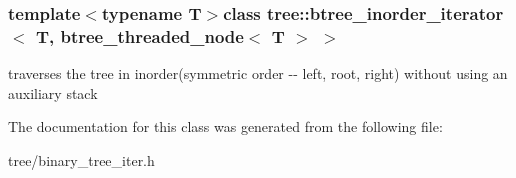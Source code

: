 \subsubsection*{template$<$typename T$>$class tree\-::btree\-\_\-inorder\-\_\-iterator$<$ T, btree\-\_\-threaded\-\_\-node$<$ T $>$ $>$}

traverses the tree in inorder(symmetric order -\/-\/ left, root, right) without using an auxiliary stack 

\-The documentation for this class was generated from the following file\-:\begin{DoxyCompactItemize}
\item 
tree/binary\-\_\-tree\-\_\-iter.\-h\end{DoxyCompactItemize}
